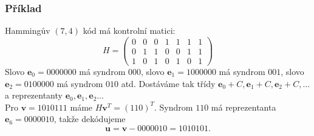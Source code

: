 \documentclass{beamer}
\newcommand{\vu}{\textbf{u}}
\newcommand{\vv}{\textbf{v}}
\newcommand{\e}{\textbf{e}}
\newcommand{\s}{\textbf{s}}
\newcommand{\emptyline}{\\$\,$\\}
\newenvironment{itemizex}%
  {\large \begin{itemize}%
    \setlength{\itemsep}{8pt}%
    \setlength{\parskip}{8pt}}%
  {\end{itemize}}
\begin{document}
\begin{frame}[t,fragile]\frametitle{Příklad} 
Hammingův $(7,4)$ kód má kontrolní matici: 
$$
H=\begin{pmatrix}
0&0&0&1&1&1&1\\
0&1&1&0&0&1&1\\
1&0&1&0&1&0&1
\end{pmatrix}
$$
Slovo $\e_0=0000000$ má syndrom $000$, slovo $\e_1=1000000$ má syndrom $001$, slovo $\e_2=0100000$ má syndrom $010$ atd. Dostáváme tak třídy $\e_0+C, \e_1+C, \e_2+C,\dots$ a reprezentanty $\e_0, \e_1, \e_2\dots$
\emptyline
Pro $\vv=1010111$ máme $H\vv^T=(110)^T$. Syndrom $110$ má reprezentanta $\e_6=0000010$, takže dekódujeme
$$
\vu=\vv-0000010=1010101.
$$
\end{frame}


\end{document}

